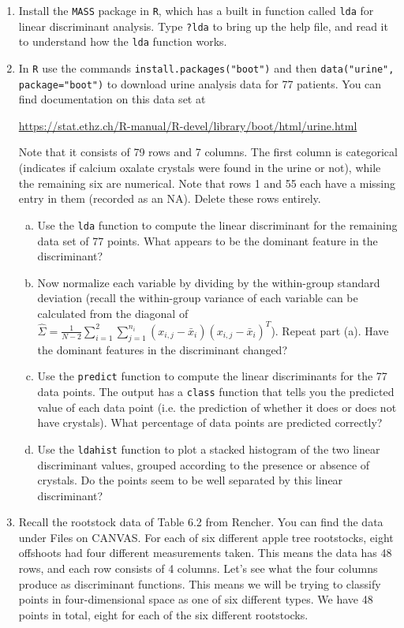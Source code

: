 \documentclass[11pt]{article}
\theoremstyle{definition}
\newcommand{\1}[1]{\mathbf{1} \left \{ #1 \right \}}
\begin{document}
\begin{enumerate}
	
	\item Install the \texttt{MASS} package in \texttt{R}, which has a built in function called \texttt{lda} for linear discriminant analysis. Type \texttt{?lda} to bring up the help file, and read it to understand how the \texttt{lda} function works.
	
	\item In \texttt{R} use the commands \texttt{install.packages("boot")} and then \texttt{data("urine", package="boot")} to download urine analysis data for 77 patients. You can find documentation on this data set at 
	\begin{center}
		\url{https://stat.ethz.ch/R-manual/R-devel/library/boot/html/urine.html}
	\end{center}
	Note that it consists of 79 rows and 7 columns. The first column is categorical (indicates if calcium oxalate crystals were found in the urine or not), while the remaining six are numerical. Note that rows 1 and 55 each have a missing entry in them (recorded as an NA). Delete these rows entirely.
	\begin{enumerate}[(a)]
		\item Use the \texttt{lda} function to compute the linear discriminant for the remaining data set of 77 points. What appears to be the dominant feature in the discriminant?
		\item Now normalize each variable by dividing by the within-group standard deviation (recall the within-group variance of each variable can be calculated from the diagonal of $\widehat{\Sigma} = \frac{1}{N-2} \sum_{i=1}^2\sum_{j=1}^{n_i} (x_{i,j} - \bar{x}_i) (x_{i,j} - \bar{x}_i)^T$). Repeat part (a). Have the dominant features in the discriminant changed?
		\item Use the \texttt{predict} function to compute the linear discriminants for the 77 data points. The output has a \texttt{class} function that tells you the predicted value of each data point (i.e. the prediction of whether it does or does not have crystals). What percentage of data points are predicted correctly? 
		\item Use the \texttt{ldahist} function to plot a stacked histogram of the two linear discriminant values, grouped according to the presence or absence of crystals. Do the points seem to be well separated by this linear discriminant?
	\end{enumerate}
	
	\item Recall the rootstock data of Table 6.2 from Rencher. You can find the data under Files on CANVAS. For each of six different apple tree rootstocks, eight offshoots had four different measurements taken. This means the data has 48 rows, and each row consists of 4 columns. Let's see what the four columns produce as discriminant functions. This means we will be trying to classify points in four-dimensional space as one of six different types. We have 48 points in total, eight for each of the six different rootstocks.
	

\end{enumerate}
\end{document}
